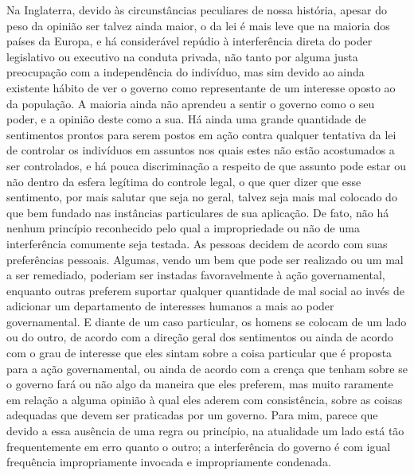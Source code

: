 Na Inglaterra, devido às circunstâncias peculiares de nossa história,
apesar do peso da opinião ser talvez ainda maior, o da lei é mais leve que
na maioria dos países da Europa, e há considerável repúdio à
interferência direta do poder legislativo ou executivo na conduta
privada, não tanto por alguma justa preocupação com a independência do
indivíduo, mas sim devido ao ainda existente hábito de ver o governo
como representante de um interesse oposto ao da população. A maioria ainda
não aprendeu a sentir o governo como o seu poder, e a opinião
deste como a sua. Há ainda uma grande quantidade de sentimentos
prontos para serem postos em ação contra qualquer tentativa da
lei de controlar os indivíduos em assuntos nos quais estes não estão
acostumados a ser controlados, e há pouca discriminação a respeito de
que assunto pode estar ou não dentro da esfera legítima do controle
legal, o que quer dizer que esse sentimento, por mais salutar que seja
no geral, talvez seja mais mal colocado do que bem fundado nas instâncias
particulares de sua aplicação. De fato, não há nenhum princípio
reconhecido pelo qual a impropriedade ou não de uma interferência
comumente seja testada. As pessoas decidem de acordo com suas
preferências pessoais. Algumas, vendo um bem que pode ser realizado ou
um mal a ser remediado, poderiam ser instadas favoravelmente à ação
governamental, enquanto outras preferem suportar qualquer
quantidade de mal social ao invés de adicionar um departamento de
interesses humanos a mais ao poder governamental. E diante de um caso
particular, os homens se colocam de um lado ou do outro, de acordo com
a direção geral dos sentimentos ou ainda de acordo com o grau de
interesse que eles sintam sobre a coisa particular que é proposta para
a ação governamental, ou ainda de acordo com a crença que tenham sobre
se o governo fará ou não algo da maneira que eles preferem, mas muito
raramente em relação a alguma opinião à qual eles aderem com
consistência, sobre as coisas adequadas que devem ser praticadas por um
governo. Para mim, parece que devido a essa ausência de uma regra ou
princípio, na atualidade um lado está tão frequentemente em erro quanto
o outro; a interferência do governo é com igual frequência
impropriamente invocada e impropriamente condenada.

